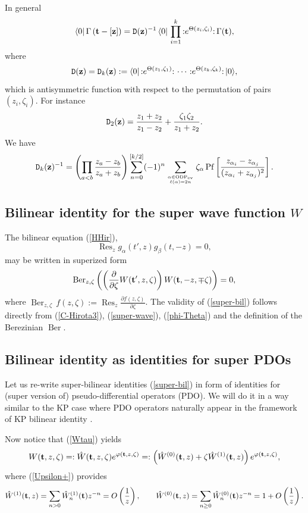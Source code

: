 \documentclass[pdftex]{sigma}
\numberwithin{equation}{section}
\newcommand{\Pf}{\mathop\mathrm{Pf}\nolimits}
\newcommand{\Res}{\mathop\mathrm{Res}\nolimits}
\newcommand{\Ber}{\mathop\mathrm{Ber}\nolimits}
\renewcommand{\l}{\langle}
\renewcommand{\r}{\rangle}
\begin{document}
In general
\[
\langle 0|\,\Gamma\left( {\bf t}-[{\bf z}]\right)=
\texttt{D}({\bf z})^{-1}\,\langle 0|\,\prod_{i=1}^k {:}
e^{\Theta(z_i,\zeta_i)}{:}\,\Gamma( {\bf t}) ,
\]
where
\[
\texttt{D}({\bf z}) = \texttt{D}_k({\bf z}) := \l
0|\,{:}e^{\Theta(z_1,\zeta_1)}{:}\, \cdots
\,{:}e^{\Theta(z_k,\zeta_k)}{:}\,|0\r,
\]
 which is antisymmetric function with respect to the permutation
 of pairs $(z_i,\zeta_i)$. For instance
  \[
\texttt{D}_2({\bf
z})=\frac{z_1+z_2}{z_1-z_2}+\frac{\zeta_1\zeta_2}{z_1+z_2}.
  \]
We have
 \begin{gather}\label{D^-1}
\texttt{D}_k({\bf
z})^{-1}= \left(\prod_{a<b}\frac{z_a-z_b}{z_a+z_b}\right) \sum_{n=0}^{\left[
k/2\right]}(-1)^{n}\sum_{\alpha\in{\rm ODP}_{\rm ev}\atop
\ell(\alpha)=2n} \zeta_\alpha \Pf\left[ \frac
{z_{\alpha_i}-z_{\alpha_j}}{(z_{\alpha_i}+z_{\alpha_j})^2} \right].
 \end{gather}





\subsection{Bilinear identity for the super wave function $W$}

  The bilinear equation (\ref{HHir}),
  \[
\Res_zg_\alpha({t'},z)g_\beta({t},-z) =0 ,
 \]
  may be written in superized form
 \begin{gather}\label{super-bil}
\Ber_{z,\zeta} \left(\left(\frac{\partial}{\partial
\zeta}W({\bf t'},z,\zeta)\right)W({\bf t},-z,\mp \zeta) \right)
 = 0 ,
\end{gather}
  where $\Ber_{z,\zeta}\,f(z,\zeta):=\Res_z
  \frac{\partial f(z,\zeta)}{\partial
  \zeta}$. The validity of (\ref{super-bil}) follows directly from
  (\ref{C-Hirota3}), (\ref{super-wave}), (\ref{phi-Theta}) and the def\/inition of the Berezinian
  $\Ber$.



\subsection{Bilinear identity as identities for super PDOs}

Let us re-write super-bilinear identities (\ref{super-bil}) in
form of identities for (super version of) pseudo-dif\/ferential
operators (PDO). We will do it in a way similar to the KP case
where PDO operators naturally appear in the framework of KP
bilinear identity \cite{DJKM}.

Now notice that (\ref{Wtau}) yields
 \begin{gather}\label{WW1W2}
 W({\bf t},z,\zeta) =:
  {\hat W}({\bf t},z,\zeta)e^{\varphi({\bf t},z,\zeta)}=:
 \left({\hat W}^{(0)}({\bf t},z)+\zeta{\hat W}^{(1)}({\bf
t},z)\right)e^{\varphi({\bf t},z,\zeta)} ,
  \end{gather}
where (\ref{Upsilon+}) provides
\[
 {\hat W}^{(1)}({\bf t},z)=\sum_{n > 0}{\hat W}_{n}^{(1)}({\bf t})z^{-n}=
 O\left(\frac 1z \right),\qquad
{\hat W}^{(0)}({\bf t},z)=\sum_{n\ge 0}{\hat W}_{n}^{(0)}({\bf
t})z^{-n}=1+O\left(\frac 1z \right) .
\]
\end{document}
